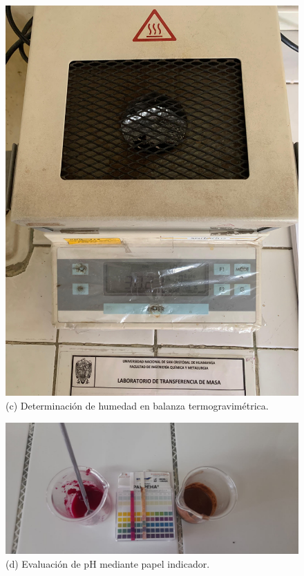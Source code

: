 \documentclass[manuscript,screen,review]{acmart}
\begin{document}
\begin{figure}[H]
  \vspace{1ex}
  \begin{minipage}{0.3\linewidth}
    \centering
    \includegraphics[width=\linewidth]{imagen/Humedad.jpeg}
    \small (c) Determinación de humedad en balanza termogravimétrica.
  \end{minipage}
  \hspace{1em}
  \begin{minipage}{0.2\linewidth}
    \centering
    \includegraphics[width=\linewidth]{imagen/pH.jpeg}
    \small (d) Evaluación de pH mediante papel indicador.
  \end{minipage}


\end{figure}
\end{document}
